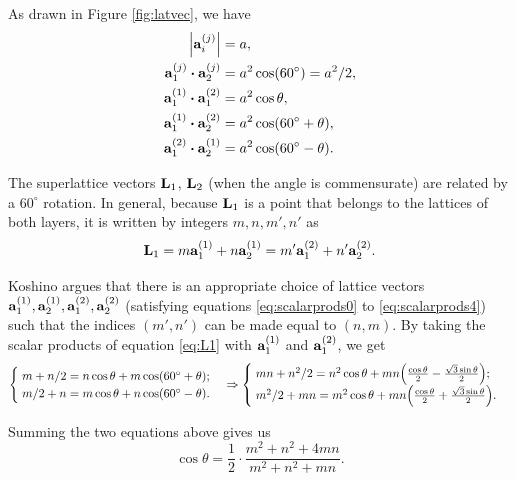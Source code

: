 As drawn in Figure \ref{fig:latvec}, we have
\begin{align}
\label{eq:scalarprods0}
\abs{\a_i^{(j)}} &= a, \\
\label{eq:scalarprods1}
\vb{a}_1^{(j)} \vdot \vb{a}_2^{(j)} &= a^2 \cos(60^\circ) = a^2/2, \\
\label{eq:scalarprods2}
\vb{a}_1^{(1)} \vdot \vb{a}_1^{(2)} &= a^2 \cos\theta, \\
\label{eq:scalarprods3}
\vb{a}_1^{(1)} \vdot \vb{a}_2^{(2)} &= a^2 \cos(60^\circ + \theta), \\
\label{eq:scalarprods4}
\vb{a}_1^{(2)} \vdot \vb{a}_2^{(1)} &= a^2 \cos(60^\circ - \theta).
\end{align}

The superlattice vectors $\vb{L}_1$, $\vb{L}_2$ (when the angle is commensurate) are related by a $60^\circ$ rotation. In general, because $\vb{L}_1$ is a point that belongs to the lattices of both layers, it is written by integers $m,n,m',n'$ as
\begin{equation} \label{eq:L1}
\vb{L}_1 = m\vb{a}_1^{(1)} + n\vb{a}_2^{(1)} = m'\vb{a}_1^{(2)} + n'\vb{a}_2^{(2)}.
\end{equation}

Koshino \cite{koshino2012} argues that there is an appropriate choice of lattice vectors $\vb{a}_1^{(1)}, \vb{a}_2^{(1)}, \vb{a}_1^{(2)}, \vb{a}_2^{(2)}$ (satisfying equations \ref{eq:scalarprods0} to \ref{eq:scalarprods4}) such that the indices $(m',n')$ can be made equal to $(n,m)$. By taking the scalar products of equation \ref{eq:L1} with $\vb{a}_1^{(1)}$ and $\vb{a}_1^{(2)}$, we get
$$
\begin{cases}
\; m + n/2 = n \cos\theta + m \cos(60^\circ + \theta); \\
\; m/2 + n = m \cos\theta + n \cos(60^\circ - \theta).
\end{cases}
\Rightarrow
\begin{cases}
\; mn + n^2/2 = n^2 \cos\theta + mn \qty(\frac{\cos\theta}{2}
- \frac{\sqrt{3} \sin\theta}{2}); \\
\; m^2/2 + mn = m^2 \cos\theta + mn \qty(\frac{\cos\theta}{2}
+ \frac{\sqrt{3} \sin\theta}{2}).
\end{cases}
$$

Summing the two equations above gives us
\begin{equation} \label{eq:costheta}
\boxed{\cos\theta = \frac{1}{2} \cdot \frac{m^2 + n^2 + 4mn}{m^2 + n^2 + mn}.}
\end{equation}

